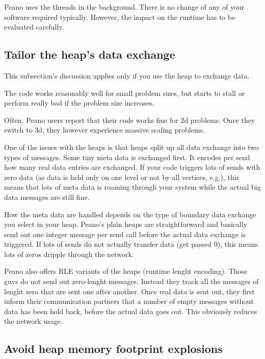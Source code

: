Peano uses the threads in the background.
There is no change of any of your software required typically.
However, the impact on the runtime has to be evaluated carefully.





\subsection{Tailor the heap's data exchange}

This subsection's discussion applies only if you use the heap to exchange data.

\begin{smell}
  The code works reasonably well for small problem sizes, but starts to stall or
  perform really bad if the problem size increases.
\end{smell}


\noindent
Often, Peano users report that their code works fine for 2d problems. Once they
switch to 3d, they however experience massive scaling problems.

One of the issues with the heaps is that heaps split up all data exchange into
two types of messages. 
Some tiny meta data is exchanged first. 
It encodes per send how many real data entries are exchanged.
If your code triggers lots of sends with zero data (as data is held only on one
level or not by all vertices, e.g.), this means that lots of meta data is
roaming through your system while the actual big data messages are still fine.

How the meta data are handled depends on the type of boundary data exchange you
select in your heap.
Peano's plain heaps are straightforward and basically send out one integer message per 
send call before the actual data exchange is triggered.
If lots of sends do not actually transfer data (get passed 0), this means lots of zeros 
dripple through the network.

Peano also offers RLE variants of the heaps (runtime lenght encoding).
Those guys do not send out zero-lenght messages.
Instead they track all the messages of lenght zero that are sent one after
another.
Once real data is sent out, they first inform their communication partners that 
a number of empty messages without data has been hold back, before the actual
data goes out.
This obviously reduces the network usage.



\subsection{Avoid heap memory footprint explosions}

